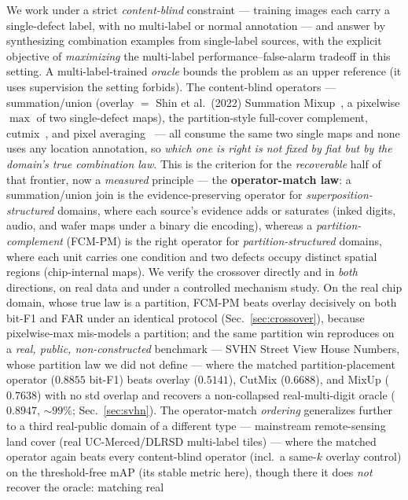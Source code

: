 \documentclass[11pt]{article}
\begin{document}
We work under a strict \emph{content-blind} constraint --- training images each carry
a single-defect label, with no multi-label or normal annotation --- and answer by
synthesizing combination examples from single-label sources, with the explicit
objective of \emph{maximizing} the multi-label performance--false-alarm tradeoff in
this setting. A multi-label-trained \emph{oracle} bounds the problem as an upper
reference (it uses supervision the setting forbids). The content-blind operators ---
summation/union (overlay $=$ Shin et al.\ (2022) Summation
Mixup~\cite{shin2022summation}, a pixelwise $\max$ of two single-defect maps), the
partition-style full-cover complement, cutmix~\cite{yun2019cutmix}, and pixel
averaging~\cite{zhang2018mixup} --- all consume the same two single maps and none uses
any location annotation, so \emph{which one is right is not fixed by fiat but by the
domain's true combination law}. This is the criterion for the \emph{recoverable} half
of that frontier, now a \emph{measured} principle --- the \textbf{operator-match law}:
a summation/union join is the
evidence-preserving operator for \emph{superposition-structured} domains, where each
source's evidence adds or saturates (inked digits, audio, and wafer maps under a
binary die encoding), whereas a \emph{partition-complement} (FCM-PM) is the right
operator for \emph{partition-structured} domains, where each unit carries one
condition and two defects occupy distinct spatial regions (chip-internal maps). We
verify the crossover directly and in \emph{both} directions, on real data and under a
controlled mechanism study. On the real chip domain, whose true law is a partition, FCM-PM
beats overlay decisively on both bit-F1 and FAR under an identical protocol
(Sec.~\ref{sec:crossover}), because pixelwise-max mis-models a partition; and the same
partition win reproduces on a \emph{real, public, non-constructed} benchmark --- SVHN Street
View House Numbers, whose partition law we did not define --- where the matched
partition-placement operator ($0.8855$ bit-F1) beats overlay ($0.5141$), CutMix ($0.6688$),
and MixUp ($0.7638$) with no std overlap and recovers a non-collapsed real-multi-digit oracle
($0.8947$, ${\sim}99\%$; Sec.~\ref{sec:svhn}). The operator-match \emph{ordering} generalizes
further to a third real-public domain of a different type --- mainstream remote-sensing land
cover (real UC-Merced/DLRSD multi-label tiles) --- where the matched operator again beats
every content-blind operator (incl.\ a same-$k$ overlay control) on the threshold-free mAP
(its stable metric here), though there it does \emph{not} recover the oracle: matching real
\end{document}
